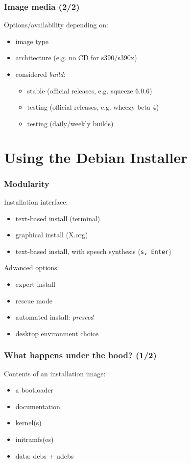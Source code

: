 \documentclass[handout]{beamer}
\begin{document}
\begin{frame}[fragile]
  \frametitle{Image media (2/2)}

  Options/availability depending on:
  \begin{itemize}
  \item image type
  \item architecture (e.g. no CD for s390/s390x)
  \item considered \textit{build}:
    \begin{itemize}
    \item stable (official releases, e.g. squeeze 6.0.6)
    \item testing (official releases, e.g. wheezy beta 4)
    \item testing (daily/weekly builds)
    \end{itemize}
  \end{itemize}
\end{frame}


\section{Using the Debian Installer}

\begin{frame}[fragile]
  \frametitle{Modularity}

  Installation interface:
  \begin{itemize}
  \item text-based install (terminal)
  \item graphical install (X.org)
  \item text-based install, with speech synthesis (\texttt{s, Enter})
  \end{itemize}

  \vspace{1em}
  \pause

  Advanced options:
  \begin{itemize}
  \item expert install
  \item rescue mode
  \item automated install: \textit{preseed}
  \item desktop environment choice
  \end{itemize}
\end{frame}

\begin{frame}[fragile]
  \frametitle{What happens under the hood? (1/2)}

  Contents of an installation image:
  \begin{itemize}
  \item a bootloader
  \item documentation
  \item kernel(s)
  \item initramfs(es)
  \item data: debs + udebs
  \end{itemize}
\end{frame}
\end{document}
